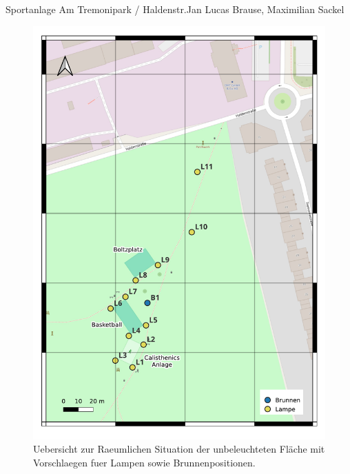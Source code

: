 \documentclass{../../templates/amendment}
\begin{document}
\begin{boxed}{Sportanlage Am Tremonipark / Haldenstr.}{Jan Lucas Brause, Maximilian Sackel}
    \begin{figure}[htpb]
        \centering
        \includegraphics[width=0.8\linewidth]{pictures/map3.pdf}
        \caption{Uebersicht zur Raeumlichen Situation der unbeleuchteten Fläche
        mit Vorschlaegen fuer Lampen sowie Brunnenpositionen.}%
        \label{fig:}
    \end{figure}
\end{boxed}
\end{document}
